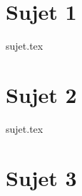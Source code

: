 \documentclass[a4paper, 11pt]{book}
\begin{document}
\chapter{Sujet 1}

\resetQ
{sujet.tex}

\newpage

\chapter{Sujet 2}

\resetQ
{sujet.tex}

\newpage

\chapter{Sujet 3}

\resetQ
\end{document}
